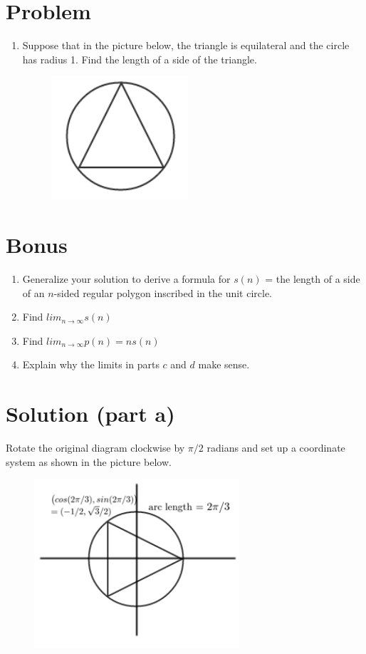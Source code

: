 \documentclass[11pt,a4paper]{report}
\theoremstyle{plain}
\theoremstyle{definition}
\theoremstyle{remark}
\begin{document}
\section*{Problem}
\begin{enumerate}[label=(\alph*)]
\item {Suppose that in the picture below, the triangle is equilateral and the circle has radius 1. Find the length of a side of the triangle.
\begin{figure}[h!]
  \includegraphics[width=2in]{triangle.png}
  {\caption*{}}
  \label{}
\end{figure}}
\end{enumerate}
\section*{Bonus}
\begin{enumerate}[label=(\alph*)]\addtocounter{enumi}{1}
\item Generalize your solution to derive a formula
for $s(n)$ = the length of a side of an 
$n$-sided regular polygon inscribed in the unit circle.
\item Find $lim_{n\to\infty}s(n)$
\item Find $lim_{n\to\infty}p(n) = ns(n)$
\item Explain why the limits in parts $c$ and $d$ 
 make sense.
\end{enumerate}

\newpage
\section*{Solution (part a)}
Rotate the original diagram clockwise by $\pi/2$ radians and set up
a coordinate system as shown in the picture below.

\begin{figure}[h!]
  \includegraphics[width=3in]{triangle2.png}
  {\caption*{}}
  \label{}
\end{figure}
\end{document}
